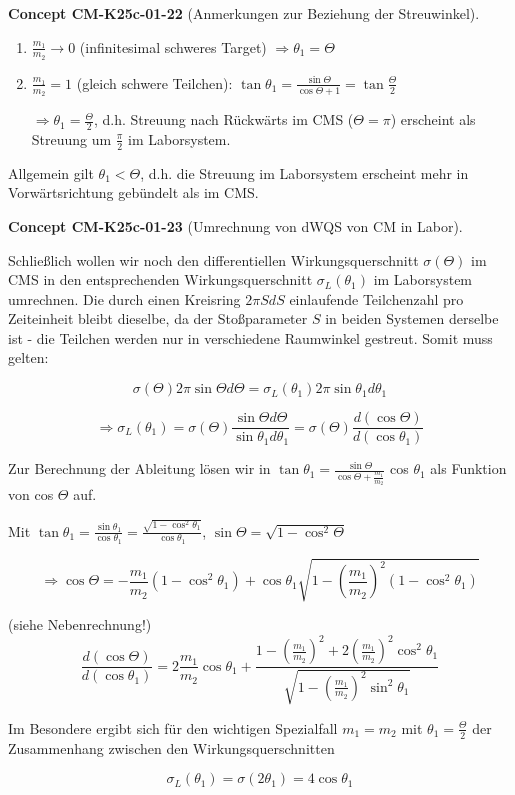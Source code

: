 \documentclass[10pt, letterpaper]{article}
\newcommand{\CustomHeading}[3]{%
  \par\medskip\noindent%
  \textbf{#1 #2} \textnormal{(#3)}.\enskip%
}
\newenvironment{CONC}[2]{\begin{unitbox}\CustomHeading{Concept}{#1}{#2}}{\end{unitbox}}
\begin{document}
\begin{CONC}{CM-K25c-01-22}{Anmerkungen zur Beziehung der Streuwinkel}
\begin{enumerate}
\item $\frac{m_1}{m_2} \to 0$ (infinitesimal schweres Target) $\Rightarrow \theta_1 = \Theta$

\item $\frac{m_1}{m_2} = 1$ (gleich schwere Teilchen): $\tan \theta_1 = \frac{\sin \Theta}{\cos \Theta + 1} = \tan \frac{\Theta}{2}$

$\Rightarrow \theta_1 = \frac{\Theta}{2}$, d.h. Streuung nach Rückwärts im CMS ($\Theta = \pi$) erscheint als Streuung um $\frac{\pi}{2}$ im Laborsystem.
\end{enumerate}

Allgemein gilt $\theta_1 < \Theta$, d.h. die Streuung im Laborsystem erscheint mehr in Vorwärtsrichtung gebündelt als im CMS.
\end{CONC}



\begin{CONC}{CM-K25c-01-23}{Umrechnung von dWQS von CM in Labor}
Schließlich wollen wir noch den differentiellen Wirkungsquerschnitt $\sigma(\Theta)$ im CMS in den entsprechenden Wirkungsquerschnitt $\sigma_L(\theta_1)$ im Laborsystem umrechnen. Die durch einen Kreisring $2\pi S dS$ einlaufende Teilchenzahl pro Zeiteinheit bleibt dieselbe, da der Stoßparameter $S$ in beiden Systemen derselbe ist - die Teilchen werden nur in verschiedene Raumwinkel gestreut. Somit muss gelten:

\[\sigma(\Theta) 2\pi \sin \Theta d\Theta = \sigma_L(\theta_1) 2\pi \sin \theta_1 d\theta_1\]

\[\Rightarrow \sigma_L(\theta_1) = \sigma(\Theta) \frac{\sin \Theta d\Theta}{\sin \theta_1 d\theta_1} = \sigma(\Theta) \frac{d(\cos \Theta)}{d(\cos \theta_1)}\]

Zur Berechnung der Ableitung lösen wir in $\tan \theta_1 = \frac{\sin \Theta}{\cos \Theta + \frac{m_1}{m_2}}$ cos $\theta_1$ als Funktion von cos $\Theta$ auf.

Mit $\tan \theta_1 = \frac{\sin \theta_1}{\cos \theta_1} = \frac{\sqrt{1-\cos^2\theta_1}}{\cos \theta_1}$, $\sin \Theta = \sqrt{1-\cos^2\Theta}$

\[\Rightarrow \cos \Theta = -\frac{m_1}{m_2}(1-\cos^2\theta_1) + \cos \theta_1 \sqrt{1-(\frac{m_1}{m_2})^2(1-\cos^2\theta_1)}\]

(siehe Nebenrechnung!)
\[\frac{d(\cos\Theta)}{d(\cos\theta_1)} = 2\frac{m_1}{m_2}\cos\theta_1 + \frac{1-(\frac{m_1}{m_2})^2+2(\frac{m_1}{m_2})^2\cos^2\theta_1}{\sqrt{1-(\frac{m_1}{m_2})^2\sin^2\theta_1}}\]

Im Besondere ergibt sich für den wichtigen Spezialfall $m_1=m_2$ mit $\theta_1=\frac{\Theta}{2}$ der Zusammenhang zwischen den Wirkungsquerschnitten

\[\sigma_L(\theta_1)=\sigma(2\theta_1)=4\cos\theta_1\]
\end{CONC}
\end{document}
